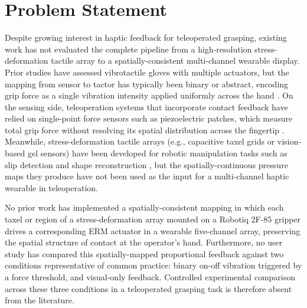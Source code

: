 \documentclass[12pt, a4paper]{report}
\begin{document}
\section{Problem Statement}
Despite growing interest in haptic feedback for teleoperated grasping, existing work has not evaluated the complete pipeline from a high-resolution stress-deformation tactile array to a spatially-consistent multi-channel wearable display. Prior studies have assessed vibrotactile gloves with multiple actuators, but the mapping from sensor to tactor has typically been binary or abstract, encoding grip force as a single vibration intensity applied uniformly across the hand \cite{pacchierotti2017}. %
On the sensing side, teleoperation systems that incorporate contact feedback have relied on single-point force sensors such as piezoelectric patches, which measure total grip force without resolving its spatial distribution across the fingertip \cite{zheng2024}. Meanwhile, stress-deformation tactile arrays (e.g., capacitive taxel grids or vision-based gel sensors) have been developed for robotic manipulation tasks such as slip detection and shape reconstruction \cite{lin2023}, but the spatially-continuous pressure maps they produce have not been used as the input for a multi-channel haptic wearable in teleoperation.

No prior work has implemented a spatially-consistent mapping in which each taxel or region of a stress-deformation array mounted on a Robotiq 2F-85 gripper drives a corresponding ERM actuator in a wearable five-channel array, preserving the spatial structure of contact at the operator's hand. Furthermore, no user study has compared this spatially-mapped proportional feedback against two conditions representative of common practice: binary on-off vibration triggered by a force threshold, and visual-only feedback. Controlled experimental comparison across these three conditions in a teleoperated grasping task is therefore absent from the literature.
\end{document}
